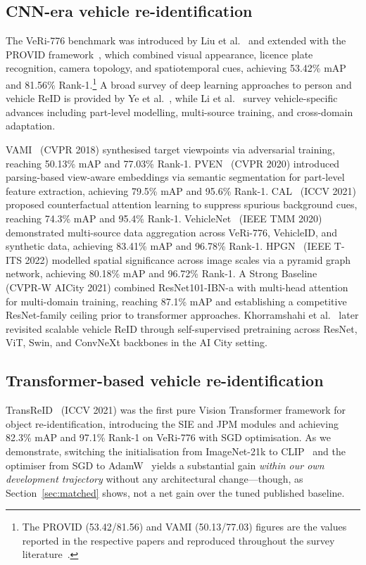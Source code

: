 \documentclass[10pt,a4paper]{article}
\begin{document}
\subsection{CNN-era vehicle re-identification}
The VeRi-776 benchmark was introduced by Liu et al.~\cite{liu2016veri} and
extended with the PROVID framework~\cite{liu2018provid}, which combined visual
appearance, licence plate recognition, camera topology, and spatiotemporal
cues, achieving 53.42\% mAP and 81.56\% Rank-1.\footnote{The PROVID
(53.42/81.56) and VAMI (50.13/77.03) figures are the values reported in the
respective papers and reproduced throughout the survey
literature~\cite{ye2022survey,li2024vehiclereidsurvey}.} A broad survey of deep
learning approaches to person and vehicle ReID is provided by Ye et
al.~\cite{ye2022survey}, while Li et al.~\cite{li2024vehiclereidsurvey} survey
vehicle-specific advances including part-level modelling, multi-source
training, and cross-domain adaptation.

VAMI~\cite{zhou2018vami} (CVPR 2018) synthesised target viewpoints via
adversarial training, reaching 50.13\% mAP and 77.03\% Rank-1.
PVEN~\cite{meng2020pven} (CVPR 2020) introduced parsing-based view-aware
embeddings via semantic segmentation for part-level feature extraction,
achieving 79.5\% mAP and 95.6\% Rank-1. CAL~\cite{rao2021cal} (ICCV 2021)
proposed counterfactual attention learning to suppress spurious background
cues, reaching 74.3\% mAP and 95.4\% Rank-1.
VehicleNet~\cite{zheng2020vehiclenet} (IEEE TMM 2020) demonstrated
multi-source data aggregation across VeRi-776, VehicleID, and synthetic data,
achieving 83.41\% mAP and 96.78\% Rank-1. HPGN~\cite{shen2022hpgn} (IEEE T-ITS
2022) modelled spatial significance across image scales via a pyramid graph
network, achieving 80.18\% mAP and 96.72\% Rank-1. A Strong
Baseline~\cite{cybercore2021strong} (CVPR-W AICity 2021) combined
ResNet101-IBN-a with multi-head attention for multi-domain training, reaching
87.1\% mAP and establishing a competitive ResNet-family ceiling prior to
transformer approaches. Khorramshahi et
al.~\cite{khorramshahi2023selfsupervision} later revisited scalable vehicle
ReID through self-supervised pretraining across ResNet, ViT, Swin, and ConvNeXt
backbones in the AI City setting.

\subsection{Transformer-based vehicle re-identification}
TransReID~\cite{he2021transreid} (ICCV 2021) was the first pure Vision
Transformer framework for object re-identification, introducing the SIE and JPM
modules and achieving 82.3\% mAP and 97.1\% Rank-1 on VeRi-776 with SGD
optimisation. As we demonstrate, switching the initialisation from ImageNet-21k
to CLIP~\cite{radford2021clip} and the optimiser from SGD to
AdamW~\cite{loshchilov2019adamw} yields a substantial gain \emph{within our own
development trajectory} without any architectural change---though, as
Section~\ref{sec:matched} shows, not a net gain over the tuned published
baseline.
\end{document}
